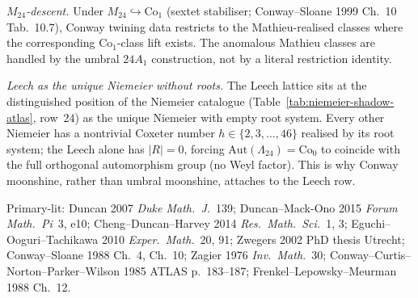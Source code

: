 \begin{remark}
\emph{$M_{24}$-descent.}
Under $M_{24}\hookrightarrow\mathrm{Co}_1$ (sextet stabiliser;
Conway--Sloane 1999 Ch.~10 Tab.~10.7), Conway twining data restricts
to the Mathieu-realised classes where the corresponding
$\mathrm{Co}_1$-class lift exists. The anomalous Mathieu classes are
handled by the umbral $24A_1$ construction, not by a literal
restriction identity.

\emph{Leech as the unique Niemeier without roots.}
The Leech lattice sits at the distinguished position of the
Niemeier catalogue (Table~\ref{tab:niemeier-shadow-atlas}, row~24) as
the unique Niemeier with empty root system. Every other Niemeier
has a nontrivial Coxeter number $h \in \{2, 3, \ldots, 46\}$ realised
by its root system; the Leech alone has $|R| = 0$, forcing
$\mathrm{Aut}(\Lambda_{24}) = \mathrm{Co}_0$ to coincide with the full
orthogonal automorphism group (no Weyl factor). This is why Conway
moonshine, rather than umbral moonshine, attaches to the Leech row.

Primary-lit: Duncan 2007 \emph{Duke Math.\ J.}~139;
Duncan--Mack-Ono 2015 \emph{Forum Math.\ Pi}~3, e10;
Cheng--Duncan--Harvey 2014 \emph{Res.\ Math.\ Sci.}~1, 3;
Eguchi--Ooguri--Tachikawa 2010 \emph{Exper.\ Math.}~20, 91;
Zwegers 2002 PhD thesis Utrecht; Conway--Sloane 1988 Ch.~4, Ch.~10;
Zagier 1976 \emph{Inv.\ Math.}~30;
Conway--Curtis--Norton--Parker--Wilson 1985 ATLAS p.~183--187;
Frenkel--Lepowsky--Meurman 1988 Ch.~12.
\end{remark}
